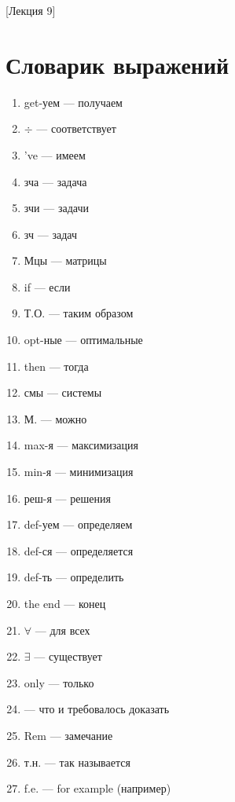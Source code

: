 [Лекция 9]

\newpage

\section{Словарик выражений}
\begin{enumerate}
    \item get-уем --- получаем
    \item $\div$ --- соответствует
    \item 've --- имеем
    \item зча --- задача
    \item зчи ---  задачи
    \item зч --- задач
    \item Мцы --- матрицы
    \item if --- если
    \item Т.О. --- таким образом
    \item opt-ные --- оптимальные
    \item then --- тогда
    \item смы --- системы
    \item М. --- можно
    \item max-я --- максимизация
    \item min-я --- минимизация
    \item реш-я --- решения
    \item def-уем --- определяем
    \item def-ся --- определяется
    \item def-ть --- определить
    \item the end --- конец
    \item $\forall$ --- для всех
    \item $\exists$ --- существует
    \item only --- только
    \item \qedsymbol --- что и требовалось доказать
    \item Rem --- замечание
    \item т.н. --- так называется
    \item f.e. --- for example (например)
\end{enumerate}
